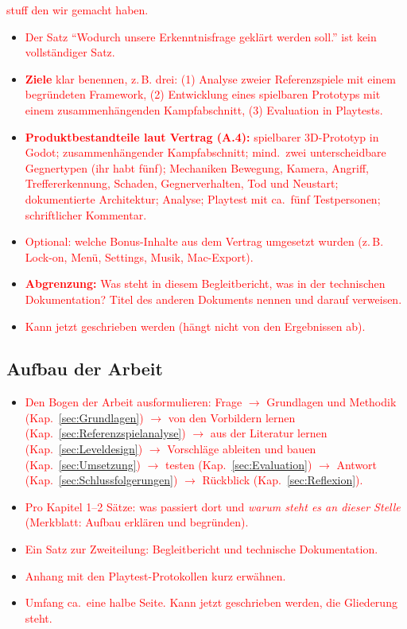 \documentclass[../Main.tex]{subfiles}
\begin{document}
\textcolor{red}{stuff den wir gemacht haben.}

\begin{itemize}[leftmargin=1.5cm]
    \item \textcolor{red}{Der Satz \enquote{Wodurch unsere Erkenntnisfrage geklärt werden soll.} ist kein vollständiger Satz.}
    \item \textcolor{red}{\textbf{Ziele} klar benennen, z.\,B. drei: (1) Analyse zweier Referenzspiele mit einem begründeten Framework, (2) Entwicklung eines spielbaren Prototyps mit einem zusammenhängenden Kampfabschnitt, (3) Evaluation in Playtests.}
    \item \textcolor{red}{\textbf{Produktbestandteile laut Vertrag (A.4):} spielbarer 3D-Prototyp in Godot; zusammenhängender Kampfabschnitt; mind.\ zwei unterscheidbare Gegnertypen (ihr habt fünf); Mechaniken Bewegung, Kamera, Angriff, Treffererkennung, Schaden, Gegnerverhalten, Tod und Neustart; dokumentierte Architektur; Analyse; Playtest mit ca.\ fünf Testpersonen; schriftlicher Kommentar.}
    \item \textcolor{red}{Optional: welche Bonus-Inhalte aus dem Vertrag umgesetzt wurden (z.\,B. Lock-on, Menü, Settings, Musik, Mac-Export).}
    \item \textcolor{red}{\textbf{Abgrenzung:} Was steht in diesem Begleitbericht, was in der technischen Dokumentation? Titel des anderen Dokuments nennen und darauf verweisen.}
    \item \textcolor{red}{Kann jetzt geschrieben werden (hängt nicht von den Ergebnissen ab).}
\end{itemize}

\subsection{Aufbau der Arbeit} \label{sec:Aufbau}

\begin{itemize}[leftmargin=1.5cm]
    \item \textcolor{red}{Den Bogen der Arbeit ausformulieren: Frage $\rightarrow$ Grundlagen und Methodik (Kap.~\ref{sec:Grundlagen}) $\rightarrow$ von den Vorbildern lernen (Kap.~\ref{sec:Referenzspielanalyse}) $\rightarrow$ aus der Literatur lernen (Kap.~\ref{sec:Leveldesign}) $\rightarrow$ Vorschläge ableiten und bauen (Kap.~\ref{sec:Umsetzung}) $\rightarrow$ testen (Kap.~\ref{sec:Evaluation}) $\rightarrow$ Antwort (Kap.~\ref{sec:Schlussfolgerungen}) $\rightarrow$ Rückblick (Kap.~\ref{sec:Reflexion}).}
    \item \textcolor{red}{Pro Kapitel 1--2 Sätze: was passiert dort und \emph{warum steht es an dieser Stelle} (Merkblatt: Aufbau erklären und begründen).}
    \item \textcolor{red}{Ein Satz zur Zweiteilung: Begleitbericht und technische Dokumentation.}
    \item \textcolor{red}{Anhang mit den Playtest-Protokollen kurz erwähnen.}
    \item \textcolor{red}{Umfang ca.\ eine halbe Seite. Kann jetzt geschrieben werden, die Gliederung steht.}
\end{itemize}

\newpage
\end{document}
